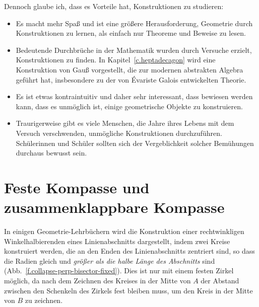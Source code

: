 Dennoch glaube ich, dass es Vorteile hat, Konstruktionen zu studieren:
\begin{itemize}
\item Es macht mehr Spaß und ist eine größere Herausforderung, Geometrie durch Konstruktionen zu lernen, als einfach nur Theoreme und Beweise zu lesen.
\item Bedeutende Durchbrüche in der Mathematik wurden durch Versuche erzielt, Konstruktionen zu finden. In Kapitel~\ref{c.heptadecagon} wird eine Konstruktion von Gauß vorgestellt, die zur modernen abstrakten Algebra geführt hat, insbesondere zu der von \'{E}variste Galois entwickelten Theorie.
\item Es ist etwas kontraintuitiv und daher sehr interessant, dass bewiesen werden kann, dass es unmöglich ist, einige geometrische Objekte zu konstruieren.
\item Traurigerweise gibt es viele Menschen, die Jahre ihres Lebens mit dem Versuch verschwenden, unmögliche Konstruktionen durchzuführen. Schülerinnen und Schüler sollten sich der Vergeblichkeit solcher Bemühungen durchaus bewusst sein.
\end{itemize}

\section{Feste Kompasse und zusammenklappbare Kompasse}\label{s.collapse}

In einigen Geometrie-Lehrbüchern wird die Konstruktion einer rechtwinkligen Winkelhalbierenden eines Linienabschnitts dargestellt, indem zwei Kreise konstruiert werden, die an den Enden des Linienabschnitts zentriert sind, so dass die Radien gleich und \emph{größer als die halbe Länge des Abschnitts} sind (Abb.~\ref{f.collapse-perp-bisector-fixed}). Dies ist nur mit einem festen Zirkel möglich, da nach dem Zeichnen des Kreises in der Mitte von $A$ der Abstand zwischen den Schenkeln des Zirkels fest bleiben muss, um den Kreis in der Mitte von $B$ zu zeichnen.

